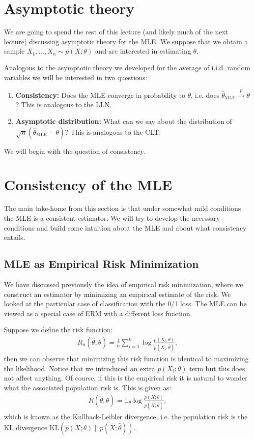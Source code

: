 \documentclass[twoside,12pt]{article}
\newcommand{\cprob}{\overset{p}{\rightarrow}}
\begin{document}
\section{Asymptotic theory}
We are going to spend the rest of this lecture (and likely much of the next lecture) discussing asymptotic theory for the MLE. We suppose that we obtain a sample $X_1,\ldots,X_n \sim p(X;\theta)$ and are interested in estimating $\theta$.

Analogous to the asymptotic theory we developed for the average of i.i.d. random variables we will be interested in two questions:
\begin{enumerate}
\item {\bf Consistency: } Does the MLE converge in probability to $\theta$, i.e. does $\widehat{\theta}_{\text{MLE}} \cprob \theta$? This is analogous to the LLN.

\item {\bf Asymptotic distribution: } What can we say about the distribution of $\sqrt{n} (\widehat{\theta}_{\text{MLE}} - \theta)$? This is analogous to the CLT.
\end{enumerate}

We will begin with the question of consistency. 

\section{Consistency of the MLE}
The main take-home from this section is that under somewhat mild conditions the MLE is a consistent estimator. We will try to develop the necessary conditions and build some intuition about the MLE and about what consistency entails.


\subsection{MLE as Empirical Risk Minimization}
We have discussed previously the idea of empirical risk minimization, where we construct an estimator by minimizing an empirical estimate of the risk. We looked at the particular case of classification with the 0/1 loss. The MLE can be viewed as a special case of ERM with a different loss function.

Suppose we define the risk function:
\begin{align*}
R_n(\widehat{\theta}, \theta) = \frac{1}{n} \sum_{i=1}^n \log \frac{p(X_i; \theta)}{p(X_i; \widehat{\theta})},
\end{align*}
then we can observe that minimizing this risk function is identical to maximizing the likelihood. Notice that we introduced an extra $p(X_i;\theta)$ term but this does not affect anything. Of course, if this is the empirical risk it is natural to wonder what the associated population risk is. This is given as:
\begin{align*}
R(\widehat{\theta},\theta) = \mathbb{E}_{\theta}  \log \frac{p(X; \theta)}{p(X; \widehat{\theta})},
\end{align*}
which is known as the Kullback-Leibler divergence, i.e. the population risk is the KL divergence 
$\text{KL}(p(X;\theta) \| p(X;\widehat{\theta})).$ 
\end{document}
